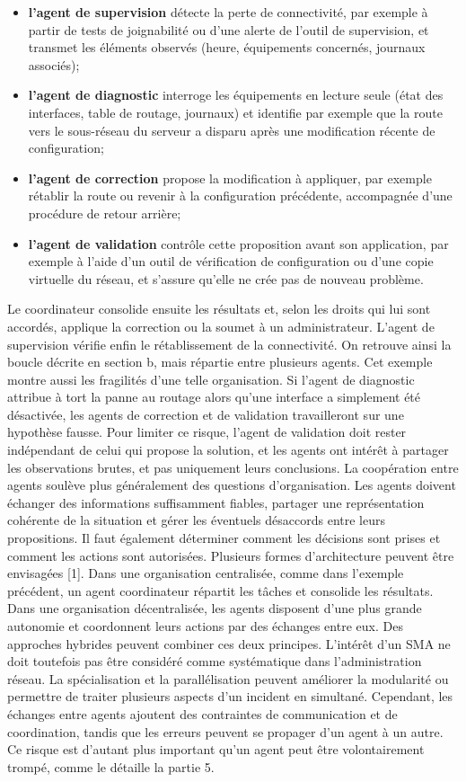 \begin{itemize}
    \item \textbf{l'agent de supervision} détecte la perte de connectivité, par exemple à partir de tests de joignabilité ou d'une alerte de l'outil de supervision, et transmet les éléments observés (heure, équipements concernés, journaux associés);
    \item \textbf{l'agent de diagnostic} interroge les équipements en lecture seule (état des interfaces, table de routage, journaux) et identifie par exemple que la route vers le sous-réseau du serveur a disparu après une modification récente de configuration;
    \item \textbf{l'agent de correction} propose la modification à appliquer, par exemple rétablir la route ou revenir à la configuration précédente, accompagnée d'une procédure de retour arrière;
    \item \textbf{l'agent de validation} contrôle cette proposition avant son application, par exemple à l'aide d'un outil de vérification de configuration ou d'une copie virtuelle du réseau, et s'assure qu'elle ne crée pas de nouveau problème.
\end{itemize}
Le coordinateur consolide ensuite les résultats et, selon les droits qui lui sont accordés, applique la correction ou la soumet à un administrateur. L'agent de supervision vérifie enfin le rétablissement de la connectivité. On retrouve ainsi la boucle décrite en section b, mais répartie entre plusieurs agents.
Cet exemple montre aussi les fragilités d'une telle organisation. Si l'agent de diagnostic attribue à tort la panne au routage alors qu'une interface a simplement été désactivée, les agents de correction et de validation travailleront sur une hypothèse fausse. Pour limiter ce risque, l'agent de validation doit rester indépendant de celui qui propose la solution, et les agents ont intérêt à partager les observations brutes, et pas uniquement leurs conclusions.
La coopération entre agents soulève plus généralement des questions d'organisation. Les agents doivent échanger des informations suffisamment fiables, partager une représentation cohérente de la situation et gérer les éventuels désaccords entre leurs propositions. Il faut également déterminer comment les décisions sont prises et comment les actions sont autorisées.
Plusieurs formes d'architecture peuvent être envisagées [1]. Dans une organisation centralisée, comme dans l'exemple précédent, un agent coordinateur répartit les tâches et consolide les résultats. Dans une organisation décentralisée, les agents disposent d'une plus grande autonomie et coordonnent leurs actions par des échanges entre eux. Des approches hybrides peuvent combiner ces deux principes.
L'intérêt d'un SMA ne doit toutefois pas être considéré comme systématique dans l'administration réseau. La spécialisation et la parallélisation peuvent améliorer la modularité ou permettre de traiter plusieurs aspects d'un incident en simultané. Cependant, les échanges entre agents ajoutent des contraintes de communication et de coordination, tandis que les erreurs peuvent se propager d'un agent à un autre. Ce risque est d'autant plus important qu'un agent peut être volontairement trompé, comme le détaille la partie 5.


